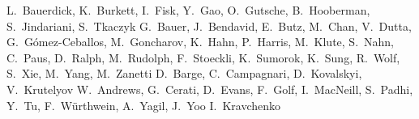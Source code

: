 \begin{Authlist}
%
L.~Bauerdick, K.~Burkett, I.~Fisk, Y.~Gao, O.~Gutsche, B.~Hooberman, S.~Jindariani, S.~Tkaczyk
%
G.~Bauer, J.~Bendavid, E.~Butz, M.~Chan, V.~Dutta, G.~G\'omez-Ceballos, M.~Goncharov, K.~Hahn, P.~Harris, M.~Klute, S.~Nahn, C.~Paus, D.~Ralph, M.~Rudolph, F.~Stoeckli, K.~Sumorok, K.~Sung, R.~Wolf, S.~Xie, M.~Yang, M.~Zanetti
%
D.~Barge, C.~Campagnari, D.~Kovalskyi, V.~Krutelyov
%
W.~Andrews, G.~Cerati, D.~Evans, F.~Golf, I.~MacNeill, S.~Padhi, Y.~Tu, F.~W\"urthwein, A.~Yagil, J.~Yoo
%
I.~Kravchenko

\end{Authlist}
